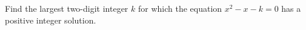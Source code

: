 Find the largest two-digit integer $k$ for which the equation $x^2-x-k=0$ has a positive integer solution.
